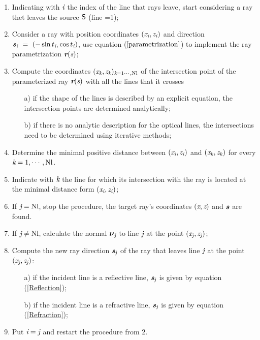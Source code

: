 \begin{enumerate}
\item Indicating with $\textit{i}$ the index of the line that rays leave, start considering a ray thet leaves the source $\textsf{S}$ (line =1);
 \item Consider a ray with position coordinates $(\textit{x}_{\textit{i}}, \textit{z}_{\textit{i}})$ and direction $\textit{\textbf{s}}_{\textit{i}}~=~(-\sin t_{\textit{i}}, \cos t_{\textit{i}})$, use equation ($\ref{parametrization}$) to implement the ray parametrization $\textit{\textbf{r}}(\textit{s})$;
\item Compute the coordinates $(\textit{x}_{\textit{k}}, \textit{z}_{\textit{k}})_{\textit{k} = 1\cdots, \textrm{Nl}}$ of the intersection point of the parameterized ray $\textit{\textbf{r}}(\textit{s})$ with all the lines that it crosses
\begin{itemize}
\item[a)] if the shape of the lines is described by an explicit equation, the intersection points are determined analytically;
\item[b)] if there is no analytic description for the optical lines, the intersections need to be determined using iterative methods;
\end{itemize}
\item  Determine the minimal positive distance between $(\textit{x}_{\textit{i}}, \textit{z}_{\textit{i}})$ and $(\textit{x}_{\textit{k}}, \textit{z}_{\textit{k}})$ for every $\textit{k}=1, \cdots, \textrm{Nl}$.
\item Indicate with $\textit{k}$ the line for which its intersection with the ray is located at the minimal distance form $(\textit{x}_{\textit{i}}, \textit{z}_{\textit{i}})$;
\item If $\textit{j} = \textrm{Nl}$, stop the procedure, the target ray's coordinates $(\textit{x}, \textit{z})$ and $\textit{\textbf{s}}$ are found.
\item If $\textit{j} \neq \textrm{Nl}$, calculate the normal $\boldsymbol{\nu}_{\textit{j}}$ to line $\textit{j}$ at the point $(\textit{x}_{\textit{j}}, \textit{z}_{\textit{j}})$;
 \item Compute the new ray direction $\textit{\textbf{s}}_{\textit{j}}$ of the ray that leaves line $\textit{j}$ at the point $(\textit{x}_{\textit{j}}, \textit{z}_{\textit{j}})$:
\begin{itemize}
\item[a)] if the incident line is a reflective line, $\textit{\textbf{s}}_{\textit{j}}$ is given by equation (\ref{Reflection});
\item[b)] if the incident line is a refractive line, $\textit{\textbf{s}}_{\textit{j}}$ is given by equation (\ref{Refraction});
\end{itemize}
\item Put $\textit{i}=\textit{j}$ and restart the procedure from $2.$
\end{enumerate}
